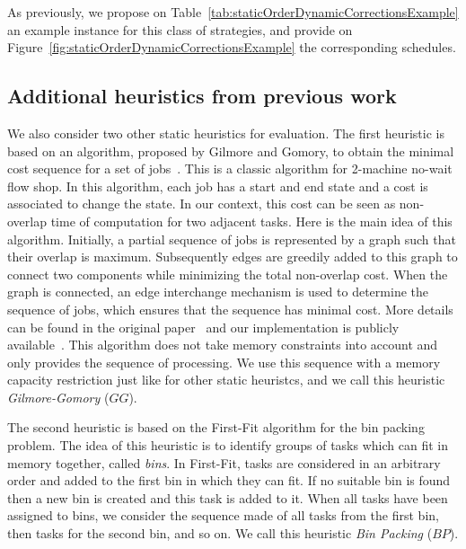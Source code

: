 \documentclass[sigconf]{acmart}
\begin{document}
	
	
	As previously, we propose on Table~\ref{tab:staticOrderDynamicCorrectionsExample} an example instance for this class of strategies, and provide on Figure~\ref{fig:staticOrderDynamicCorrectionsExample} the corresponding schedules.
	
		\subsection{Additional heuristics from previous work}

We also consider two other static heuristics for evaluation. The first heuristic is based on an algorithm, proposed by Gilmore and Gomory, to obtain the minimal cost sequence for a set of jobs~\cite{Gilmore-Gomory:1964}. This is a classic algorithm for 2-machine no-wait flow shop. In this algorithm, each job has a start and end state and a cost is associated to change the state. In our context, this cost can be seen as non-overlap time of computation for two adjacent tasks. Here is the main idea of this algorithm. Initially, a partial sequence of jobs is represented by a graph such that their overlap is maximum. Subsequently edges are greedily added to this graph to connect two components while minimizing the total non-overlap cost. When the graph is  connected, an edge interchange mechanism is used to determine the sequence of jobs, which ensures that the sequence has minimal cost. More details can be found in the original paper~\cite{Gilmore-Gomory:1964} and our implementation is publicly available~\cite{gitworkrepo}. This algorithm does not take memory constraints into account and only provides the sequence of processing. We use this sequence with a memory capacity restriction just like for other static heuristcs, and we call this heuristic \textit{Gilmore-Gomory} ($GG$).

The second heuristic is based on the First-Fit algorithm for the bin packing problem. The idea of this heuristic is to identify groups of tasks which can fit in memory together, called \emph{bins}. In First-Fit, tasks are considered in an arbitrary order and added to the first bin in which they can fit. If no suitable bin is found then a new bin is created and this task is added to it. When all tasks have been assigned to bins, we consider the sequence made of all tasks from the first bin, then tasks for the second bin, and so on. We call this heuristic \textit{Bin Packing} ($BP$). 
\end{document}
